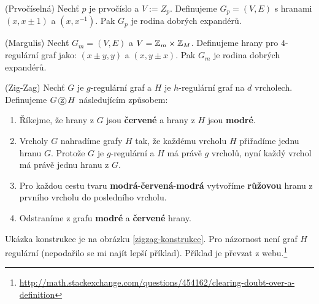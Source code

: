 \vt (Prvočíselná) Nechť $p$ je prvočíslo a $V:=Z_p$. Definujeme $G_p=(V,E)$ s 
hranami $(x, x\pm 1)$ a $(x,x^{-1})$. Pak $G_p$ je rodina dobrých expandérů.

\vt (Margulis) Nechť $G_m=(V,E)$ a $V=\mathbb{Z}_m \times \mathbb{Z}_M$. Definujeme hrany pro 
$4$-regulární graf jako: $(x\pm y, y)$ a $(x,y\pm x)$. Pak $G_m$ je rodina 
dobrých expandérů.

\df (Zig-Zag) Nechť $G$ je $g$-regulární graf a $H$ je $h$-regulární graf na $d$ 
vrcholech. Definujeme $G \zz H$ následujícím způsobem:
\begin{enumerate}
	\item Říkejme, že hrany z $G$ jsou {\bf\color{red}červené} a hrany z $H$ 
		jsou {\bf\color{blue}modré}.
	\item Vrcholy $G$ nahradíme grafy $H$ tak, že každému vrcholu $H$ přiřadíme 
	jednu hranu $G$. Protože $G$ je $g$-regulární a $H$ má právě $g$ vrcholů, 
	nyní každý vrchol má právě jednu hranu z $G$.
	\item Pro každou cestu tvaru 
		{\bf\color{blue}modrá}-{\bf\color{red}červená}-{\bf\color{blue}modrá} 
		vytvoříme {\bf\color{magenta}růžovou} hranu z prvního vrcholu do 
		posledního vrcholu.
	\item Odstraníme z grafu {\bf\color{blue}modré} a {\bf\color{red}červené} 
		hrany.
\end{enumerate}
Ukázka konstrukce je na obrázku \ref{zigzag-konstrukce}. Pro názornost není
graf $H$ regulární (nepodařilo se mi najít lepší příklad). Příklad je převzat z
webu.\footnote{\url{http://math.stackexchange.com/questions/454162/clearing-doubt-over-a-definition}}

